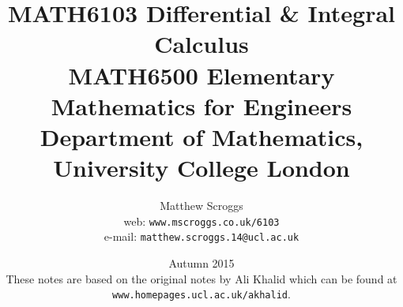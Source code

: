 \title{MATH6103 Differential \& Integral Calculus \\
MATH6500 Elementary Mathematics for Engineers \\[1in]
Department of Mathematics, \\
University College London \\[1.5in]}
\author{\Large Matthew Scroggs \\
web: \texttt{www.mscroggs.co.uk/6103} \\
e-mail: \texttt{matthew.scroggs.14@ucl.ac.uk}}
\date{\Large Autumn 2015\\
{\tiny These notes are based on the original notes by Ali Khalid which can be found at \texttt{www.homepages.ucl.ac.uk/akhalid}.}
}

\frontmatter
\maketitle
\tableofcontents

\mainmatter

